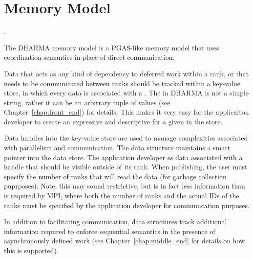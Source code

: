 \section{Memory Model}
\label{sec:mem_model}

.



The DHARMA memory model is a \gls{PGAS}-like memory model that uses
\gls{coordination semantics} in place of direct communication.


Data that acts as any kind of dependency to deferred work within a rank, or
that needs to be communicated between ranks should be tracked within a
\gls{key-value store}, in which every data  is associated
with a .
The  in DHARMA is not a simple
string, rather it can be an arbitrary \gls{tuple} of values (see Chapter~\ref{chap:front_end}) for details.
This makes it very easy for the applicaiton developer to create an expressive
and descriptive  for a given  in the store.


Data \glspl{handle} into the \gls{key-value store} are used to manage
complexities associated with parallelism and communication.  
The  data structure maintains a smart pointer into the data
store.  The application developer es data associated with a
handle that should be visible
outside of its \gls{rank}.  When publishing,  the user must specify the
number of \glspl{rank} that will read the data (for garbage
    collection puprposes).  Note, this may sound restrictive, but is in fact
less information than is required by \gls{MPI}, where both the number of ranks
and the actual IDs of the ranks must be specified by the application developer
for communication purposes.

In addition to facilitating communication,  data structures track additional information required 
to enforce \gls{sequential semantics} in the presence of asynchronously defined
work (see Chapter~\ref{chap:middle_end} for details on how this is supported).


